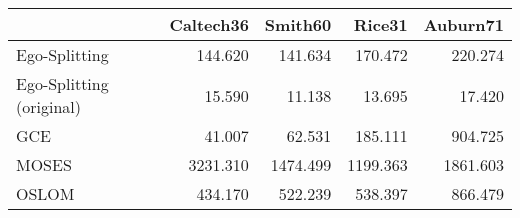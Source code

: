 \begin{tabular}{lrrrr}
\toprule
{} & Caltech36 &  Smith60 &   Rice31 & Auburn71 \\
\midrule
Ego-Splitting            &   144.620 &  141.634 &  170.472 &  220.274 \\
Ego-Splitting (original) &    15.590 &   11.138 &   13.695 &   17.420 \\
GCE                      &    41.007 &   62.531 &  185.111 &  904.725 \\
MOSES                    &  3231.310 & 1474.499 & 1199.363 & 1861.603 \\
OSLOM                    &   434.170 &  522.239 &  538.397 &  866.479 \\
\bottomrule
\end{tabular}
